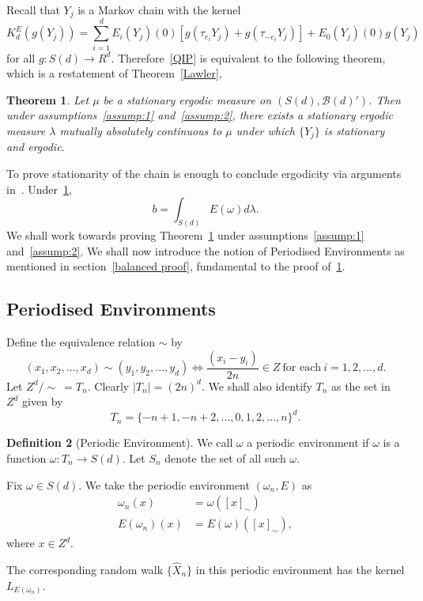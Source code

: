 \documentclass[final]{aomart}
\def\mathscr#1{#1}%
\def\mathbb#1{#1}%
\theoremstyle{plain}
\newtheorem{theorem}{Theorem}[section]
\theoremstyle{definition}
\newtheorem{definition}[theorem]{Definition}
\theoremstyle{remark}
\begin{document}
Recall that $Y_j$ is a Markov chain with the kernel \[ K^{\mathscr{E}}_d(g(Y_j)) = \sum_{i=1}^d \mathscr{E}_i(Y_j)(0)[ g(\tau_{e_i} Y_j) +g(\tau_{-e_i}Y_j)]  + \mathscr{E}_0(Y_j)(0)g(Y_j)
\] 
for all $g: \mathscr{S}(d) \to \mathbb{R}^d$. Therefore~\ref{QIP} is equivalent to the following theorem, which is a restatement of Theorem~\ref{Lawler}, \begin{theorem}\label{2}
Let $\mu$ be a stationary ergodic measure on $(\mathscr{S}(d), \mathcal{B}(d)')$. Then under assumptions~\ref{assump:1} and~\ref{assump:2}, there exists a stationary ergodic measure $\lambda$ mutually absolutely continuous to $\mu$ under which $\{Y_j\}$ is stationary and ergodic. 
\end{theorem}
To prove stationarity of the chain is enough to conclude ergodicity via arguments in~\cite{BolthausenSznitman2002}. 
Under~\ref{2}, \[
b= \int_{\mathscr{S}(d)} \mathscr{E(}\omega) d\lambda.
\]
We shall work towards proving Theorem~\ref{2} under assumptions~\ref{assump:1} and~\ref{assump:2}. We shall now introduce the notion of Periodised Environments as mentioned in section~\ref{balanced proof}, fundamental to the proof of~\ref{2}. 
\subsection{Periodised Environments}
Define the equivalence relation $\sim$ by \[
(x_1,x_2,\dots,x_d)\sim (y_1,y_2,\dots,y_d) \iff \frac{(x_i -y_i)}{2n} \in \mathbb{Z}~\text{for each}~i=1,2,\dots,d. 
\]
Let $\mathbb{Z}^d/ \sim ~= T_n$. Clearly $|T_n|=(2n)^d$. We shall also identify $T_n$ as the set in $\mathbb{Z}^d$ given by \[
T_n = \{-n+1,-n+2,\dots,0,1,2,\dots,n\}^d. 
\] 
\begin{definition}[Periodic Environment]
We call $\omega$ a periodic environment if $\omega$ is a function $
\omega:T_n\to S(d)$.  Let $\mathscr{S}_n$ denote the set of all such $\omega$. 
\end{definition}
Fix $\omega \in \mathscr{S}(d)$. We take the periodic environment $(\omega_n, \mathscr{E})$ as \begin{align*}
\omega_n (x) 
&= \omega( [x]_{\sim})\\  
\mathscr{E}(\omega_n) (x) 
&= \mathscr{E} (\omega)( [x]_{\sim}),
\end{align*}
where $x \in \mathbb{Z}^d$. 
 
The corresponding random walk $\{\hat{X}_n\}$ in this periodic environment has the kernel $L_{\mathscr{E}(\omega_n)}$. 
 
\end{document}
